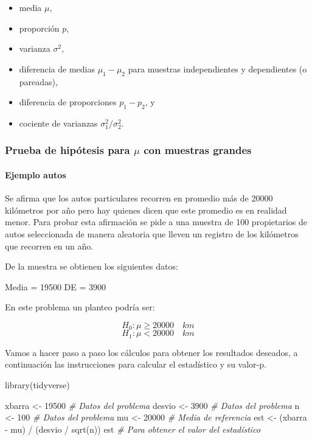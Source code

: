 \documentclass[
]{article}
\newenvironment{Shaded}{}{}
\newcommand{\CommentTok}[1]{\textcolor[rgb]{0.38,0.63,0.69}{\textit{#1}}}
\newcommand{\DecValTok}[1]{\textcolor[rgb]{0.25,0.63,0.44}{#1}}
\newcommand{\FunctionTok}[1]{\textcolor[rgb]{0.02,0.16,0.49}{#1}}
\newcommand{\NormalTok}[1]{#1}
\newcommand{\OtherTok}[1]{\textcolor[rgb]{0.00,0.44,0.13}{#1}}
\newcommand{\SpecialCharTok}[1]{\textcolor[rgb]{0.25,0.44,0.63}{#1}}
\providecommand{\tightlist}{%
  \setlength{\itemsep}{0pt}\setlength{\parskip}{0pt}}
\begin{document}
\begin{itemize}
\tightlist
\item
  media \(\mu\),
\item
  proporción \(p\),
\item
  varianza \(\sigma^2\),
\item
  diferencia de medias \(\mu_1-\mu_2\) para muestras independientes y
  dependientes (o pareadas),
\item
  diferencia de proporciones \(p_1 - p_2\), y
\item
  cociente de varianzas \(\sigma_1^2 / \sigma_2^2\).
\end{itemize}

\hypertarget{prueba-de-hipuxf3tesis-para-mu-con-muestras-grandes}{%
\subsubsection{\texorpdfstring{Prueba de hipótesis para \(\mu\) con
muestras
grandes}{Prueba de hipótesis para \textbackslash mu con muestras grandes}}\label{prueba-de-hipuxf3tesis-para-mu-con-muestras-grandes}}

\hypertarget{ejemplo-autos}{%
\paragraph{Ejemplo autos}\label{ejemplo-autos}}

Se afirma que los autos particulares recorren en promedio más de 20000
kilómetros por año pero hay quienes dicen que este promedio es en
realidad menor. Para probar esta afirmación se pide a una muestra de 100
propietarios de autos seleccionada de manera aleatoria que lleven un
registro de los kilómetros que recorren en un año.

De la muestra se obtienen los siguientes datos:

Media = 19500 DE = 3900

En este problema un planteo podría ser:

\[H_0: \mu \ge 20000 \quad km\] \[H_1: \mu < 20000 \quad km\]

Vamos a hacer paso a paso los cálculos para obtener los resultados
deseados, a continuación las instrucciones para calcular el estadístico
y su valor-p.

\begin{Shaded}
\begin{Highlighting}[]
\FunctionTok{library}\NormalTok{(tidyverse)}

\NormalTok{xbarra }\OtherTok{\textless{}{-}} \DecValTok{19500}  \CommentTok{\# Datos del problema}
\NormalTok{desvio }\OtherTok{\textless{}{-}} \DecValTok{3900}   \CommentTok{\# Datos del problema}
\NormalTok{n }\OtherTok{\textless{}{-}} \DecValTok{100}         \CommentTok{\# Datos del problema}
\NormalTok{mu }\OtherTok{\textless{}{-}} \DecValTok{20000}      \CommentTok{\# Media de referencia}
\NormalTok{est }\OtherTok{\textless{}{-}}\NormalTok{ (xbarra }\SpecialCharTok{{-}}\NormalTok{ mu) }\SpecialCharTok{/}\NormalTok{ (desvio }\SpecialCharTok{/} \FunctionTok{sqrt}\NormalTok{(n))}
\NormalTok{est  }\CommentTok{\# Para obtener el valor del estadístico}
\end{Highlighting}
\end{Shaded}
\end{document}
